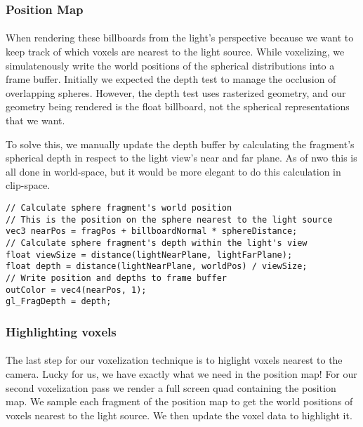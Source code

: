 
\newpage
\subsubsection{Position Map}\paragraph{}
When rendering these billboards from the light's perspective because we want to keep track of which voxels are nearest to the light source. While voxelizing, we simulatenously write the world positions of the spherical distributions into a frame buffer. 
Initially we expected the depth test to manage the occlusion of overlapping spheres. 
However, the depth test uses rasterized geometry, and our geometry being rendered is the float billboard, not the spherical representations that we want. 

To solve this, we manually update the depth buffer by calculating the fragment's spherical depth in respect to the light view's near and far plane. As of nwo this is all done in world-space, but it would be more elegant to do this calculation in clip-space.
\begin{lstlisting}[caption={first\_voxelize.glsl, 60}]
// Calculate sphere fragment's world position 
// This is the position on the sphere nearest to the light source
vec3 nearPos = fragPos + billboardNormal * sphereDistance;
// Calculate sphere fragment's depth within the light's view
float viewSize = distance(lightNearPlane, lightFarPlane);
float depth = distance(lightNearPlane, worldPos) / viewSize;
// Write position and depths to frame buffer
outColor = vec4(nearPos, 1);
gl_FragDepth = depth;
\end{lstlisting}


\subsubsection{Highlighting voxels}\paragraph{}
The last step for our voxelization technique is to higlight voxels nearest to the camera. Lucky for us, we have exactly what we need in the position map! 
For our second voxelization pass we render a full screen quad containing the position map. We sample each fragment of the position map to get the world positions of voxels nearest to the light source. We then update the voxel data to highlight it. 

